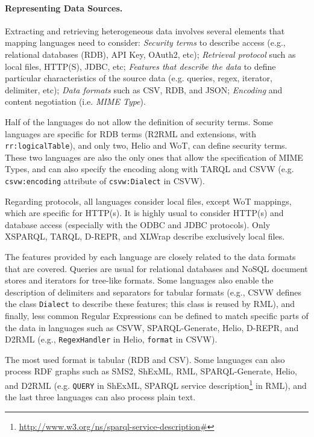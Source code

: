 \noindent\paragraph{\textbf{Representing Data Sources.}} Extracting and retrieving heterogeneous data involves several elements that mapping languages need to consider: \textit{Security terms} to describe access (e.g., relational databases (RDB), API Key, OAuth2, etc); \textit{Retrieval protocol} such as local files, HTTP(S), JDBC, etc; \textit{Features that describe the data} to define particular characteristics of the source data (e.g. queries, regex, iterator, delimiter, etc); \textit{Data formats} such as CSV, RDB, and JSON; \textit{Encoding} and content negotiation (i.e. \textit{MIME Type}). 

Half of the languages do not allow the definition of security terms. Some languages are specific for RDB terms (R2RML and extensions, with \texttt{rr:logical\-Table}), and only two, Helio and WoT, can define security terms. These two languages are also the only ones that allow the specification of MIME Types, and can also specify the encoding along with TARQL and CSVW (e.g. \texttt{csvw:encoding} attribute of \texttt{csvw:Dialect} in CSVW). 

Regarding protocols, all languages consider local files, except WoT mappings, which are specific for HTTP(s). It is highly usual to consider HTTP(s) and database access (especially with the ODBC and JDBC protocols). Only XSPARQL, TARQL, D-REPR, and XLWrap describe exclusively local files. 

The features provided by each language are closely related to the data formats that are covered. Queries are usual for relational databases and NoSQL document stores and iterators for tree-like formats. Some languages also enable the description of delimiters and separators for tabular formats (e.g., CSVW defines the class \texttt{Dialect} to describe these features; this class is reused by RML), and finally, less common Regular Expressions can be defined to match specific parts of the data in languages such as CSVW, SPARQL-Generate, Helio, D-REPR, and D2RML (e.g., \texttt{RegexHandler} in Helio, \texttt{format} in CSVW). 

The most used format is tabular (RDB and CSV). Some languages can also process RDF graphs such as SMS2, ShExML, RML, SPARQL-Generate, Helio, and D2RML (e.g. \texttt{QUERY} in ShExML,  SPARQL service description\footnote{\url{http://www.w3.org/ns/sparql-service-description\#}} in RML), and the last three languages can also process plain text.


